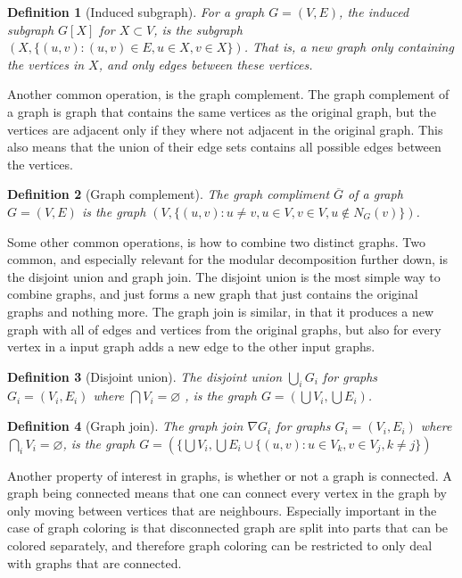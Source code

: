 \documentclass{amsart}
\newtheorem{definition}{Definition}[section]
\begin{document}
\begin{definition}[Induced subgraph]
    
    For a graph $G = (V,E)$, the induced subgraph $G[X]$ for $X \subset V$, is
    the subgraph $(X,\{(u,v) : (u,v) \in E, u \in X,v \in X\})$. That
    is, a new graph only containing the vertices in $X$, and only edges between
    these vertices.

\end{definition}

Another common operation, is the graph complement. The graph complement of a
graph is graph that contains the same vertices as the original graph, but the
vertices are adjacent only if they where not adjacent in the original graph.
This also means that the union of their edge sets contains all possible edges
between the vertices.

\begin{definition}[Graph complement]
    The graph compliment $\overline{G}$ of a graph $G = (V,E)$ is the graph 
    $(V,\{ (u,v) : u \neq v, u \in V,v \in V, u \notin N_G(v) \})$.
\end{definition}

Some other common operations, is how to combine two distinct graphs. Two common,
and especially relevant for the modular decomposition further down, is the
disjoint union and graph join. The disjoint union is the most simple way to
combine graphs, and just forms a new graph that just contains the original graphs
and nothing more. 
The graph join is similar, in that it produces a new graph with all of edges
and vertices from the original graphs, but also for every vertex in a
input graph adds a new edge to the other input graphs.

\begin{definition}[Disjoint union]
    The disjoint union $\bigcup_i G_i$ for graphs $G_i = (V_i,E_i)$ where 
    $\bigcap V_i = \varnothing $ , is the graph
    $G = \left( \bigcup V_i,\bigcup E_i \right)$.
\end{definition}

\begin{definition}[Graph join]
    The graph join $\nabla G_i$ for graphs $G_i = (V_i,E_i)$ where 
    $\bigcap_i V_i = \varnothing$, is the graph $G = (\{\bigcup V_i,
    \bigcup E_i \cup \{(u,v) : u \in V_k, v \in V_j, k \neq j \})$
\end{definition}


Another property of interest in graphs, is whether or not a graph is connected. A
graph being connected means that one can connect every vertex in the graph by
only moving between vertices that are neighbours. Especially important in the
case of graph coloring is that disconnected graph are split into parts that can
be colored separately, and therefore graph coloring can be restricted to only
deal with graphs that are connected.
\end{document}
